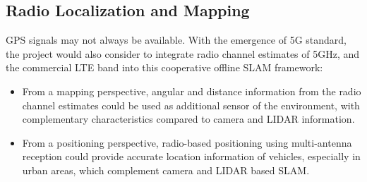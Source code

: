 \subsection{Radio Localization and Mapping}

GPS signals may not always be available. With the emergence of 5G
standard, the project would also consider to integrate radio channel
estimates of 5GHz, and the commercial LTE
band into this cooperative offline \gls{SLAM} framework:
\begin{itemize}
\item   From a mapping perspective, angular and distance information
  from the radio channel estimates could be used as additional sensor
  of the environment, with complementary characteristics compared to
  camera and LIDAR information.
\item From a positioning perspective, radio-based positioning using
multi-antenna reception could provide accurate location information of
vehicles, especially in urban areas, which complement camera and LIDAR
based SLAM.
\end{itemize}

